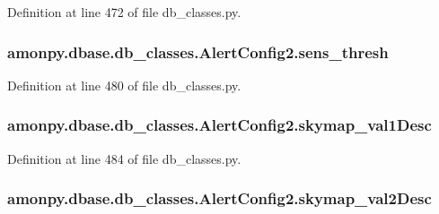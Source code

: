 Definition at line 472 of file db\-\_\-classes.\-py.

\hypertarget{classamonpy_1_1dbase_1_1db__classes_1_1_alert_config2_acf76b84f2e496115285d95ccf2d60c22}{
\subsubsection[{sens\-\_\-thresh}]{\setlength{\rightskip}{0pt plus 5cm}amonpy.\-dbase.\-db\-\_\-classes.\-Alert\-Config2.\-sens\-\_\-thresh}}\label{classamonpy_1_1dbase_1_1db__classes_1_1_alert_config2_acf76b84f2e496115285d95ccf2d60c22}


Definition at line 480 of file db\-\_\-classes.\-py.

\hypertarget{classamonpy_1_1dbase_1_1db__classes_1_1_alert_config2_a3f204082c6db7abec1c48e3599a5fe0b}{
\subsubsection[{skymap\-\_\-val1\-Desc}]{\setlength{\rightskip}{0pt plus 5cm}amonpy.\-dbase.\-db\-\_\-classes.\-Alert\-Config2.\-skymap\-\_\-val1\-Desc}}\label{classamonpy_1_1dbase_1_1db__classes_1_1_alert_config2_a3f204082c6db7abec1c48e3599a5fe0b}


Definition at line 484 of file db\-\_\-classes.\-py.

\hypertarget{classamonpy_1_1dbase_1_1db__classes_1_1_alert_config2_ab819dfd55a24c72966efc393ecb82261}{
\subsubsection[{skymap\-\_\-val2\-Desc}]{\setlength{\rightskip}{0pt plus 5cm}amonpy.\-dbase.\-db\-\_\-classes.\-Alert\-Config2.\-skymap\-\_\-val2\-Desc}}\label{classamonpy_1_1dbase_1_1db__classes_1_1_alert_config2_ab819dfd55a24c72966efc393ecb82261}


